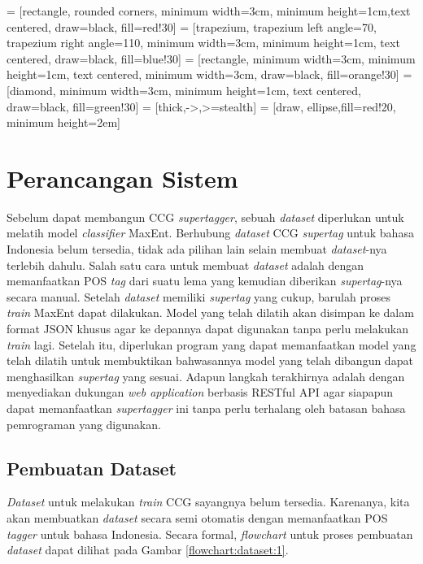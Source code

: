  = [rectangle, rounded corners, minimum width=3cm, minimum height=1cm,text centered, draw=black, fill=red!30]
 = [trapezium, trapezium left angle=70, trapezium right angle=110, minimum width=3cm, minimum height=1cm, text centered, draw=black, fill=blue!30]
 = [rectangle, minimum width=3cm, minimum height=1cm, text centered, minimum width=3cm, draw=black, fill=orange!30]
 = [diamond, minimum width=3cm, minimum height=1cm, text centered, draw=black, fill=green!30]
 = [thick,->,>=stealth]
 = [draw, ellipse,fill=red!20, minimum height=2em]

\chapter{Perancangan Sistem}

Sebelum dapat membangun CCG \textit{supertagger}, sebuah \textit{dataset} diperlukan untuk melatih model
\textit{classifier} MaxEnt.
Berhubung \textit{dataset} CCG \textit{supertag} untuk bahasa Indonesia belum tersedia, tidak ada pilihan
lain selain membuat \textit{dataset}-nya terlebih dahulu.
Salah satu cara untuk membuat \textit{dataset} adalah dengan memanfaatkan POS \textit{tag} dari suatu
lema yang kemudian diberikan \textit{supertag}-nya secara manual.
Setelah \textit{dataset} memiliki \textit{supertag} yang cukup, barulah proses \textit{train} MaxEnt
dapat dilakukan.
Model yang telah dilatih akan disimpan ke dalam format JSON khusus agar ke depannya dapat digunakan
tanpa perlu melakukan \textit{train} lagi.
Setelah itu, diperlukan program yang dapat memanfaatkan model yang telah dilatih untuk membuktikan
bahwasannya model yang telah dibangun dapat menghasilkan \textit{supertag} yang sesuai.
Adapun langkah terakhirnya adalah dengan menyediakan dukungan \textit{web application} berbasis
RESTful API agar siapapun dapat memanfaatkan \textit{supertagger} ini tanpa perlu terhalang oleh
batasan bahasa pemrograman yang digunakan.

\section{Pembuatan Dataset}

\textit{Dataset} untuk melakukan \textit{train} CCG sayangnya belum tersedia.
Karenanya, kita akan membuatkan \textit{dataset} secara semi otomatis dengan memanfaatkan POS
\textit{tagger} untuk bahasa Indonesia.
Secara formal, \textit{flowchart} untuk proses pembuatan \textit{dataset} dapat dilihat pada
Gambar \ref{flowchart:dataset:1}.

